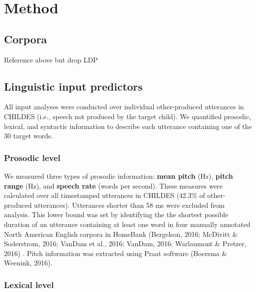 \documentclass[10pt, letterpaper]{article}
\begin{document}
\hypertarget{method-1}{%
\section{Method}\label{method-1}}

\hypertarget{corpora-1}{%
\subsection{Corpora}\label{corpora-1}}

Reference above but drop LDP

\hypertarget{linguistic-input-predictors}{%
\subsection{Linguistic input
predictors}\label{linguistic-input-predictors}}

All input analyses were conducted over individual other-produced
utterances in CHILDES (i.e., speech not produced by the target child).
We quantified prosodic, lexical, and syntactic information to describe
each utterance containing one of the 30 target words.

\hypertarget{prosodic-level}{%
\subsubsection{Prosodic level}\label{prosodic-level}}

We measured three types of prosodic information: \textbf{mean pitch}
(Hz), \textbf{pitch range} (Hz), and \textbf{speech rate} (words per
second). These measures were calculated over all timestamped utterances
in CHILDES (42.3\% of other-produced utterances). Utterances shorter
than 58 ms were excluded from analysis. This lower bound was set by
identifying the the shortest possible duration of an utterance
containing at least one word in four manually annotated North American
English corpora in HomeBank (Bergelson, 2016; McDivitt \& Soderstrom,
2016; VanDam et al., 2016; VanDam, 2016; Warlaumont \& Pretzer, 2016) .
Pitch information was extracted using Praat software (Boersma \&
Weenink, 2016).

\hypertarget{lexical-level}{%
\subsubsection{Lexical level}\label{lexical-level}}
\end{document}
